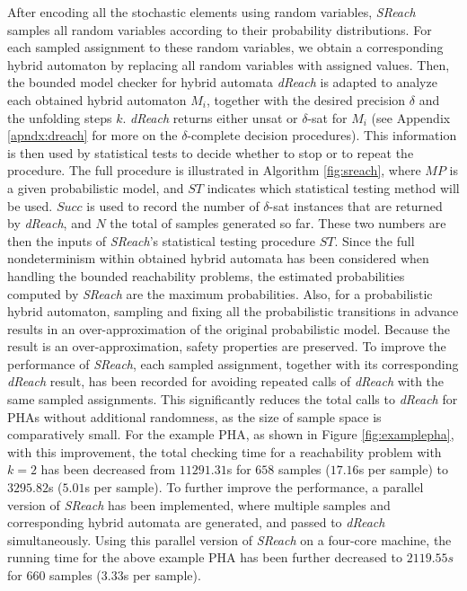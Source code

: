 After encoding all the stochastic elements using random variables, {\it SReach} samples all random variables according to their probability distributions. For each sampled assignment to these random variables, we obtain a corresponding hybrid automaton by replacing all random variables with assigned values. Then, the bounded model checker for hybrid automata {\it dReach} \cite{gaodelta} is adapted to analyze each obtained hybrid automaton $M_i$, together with the desired precision $\delta$ and the unfolding steps $k$. {\it dReach} returns either unsat or $\delta$-sat for $M_i$ (see Appendix \ref{apndx:dreach} for more on the $\delta$-complete decision procedures). This information
is then used by statistical tests to decide whether to stop or to repeat the procedure. The full procedure is illustrated in Algorithm \ref{fig:sreach}, where $MP$ is a given probabilistic model, and $ST$ indicates which statistical testing method will be used. $Succ$ is used to record the number of $\delta$-sat instances that are returned by {\it dReach}, and $N$ the total of samples generated so far. These two numbers are then the inputs of {\it SReach}'s statistical testing procedure $ST$. Since the full nondeterminism within obtained hybrid automata has been considered when handling the bounded reachability problems, the estimated probabilities computed by {\it SReach} are the maximum probabilities. Also, for a probabilistic hybrid automaton, sampling and fixing all the probabilistic transitions in advance results in an over-approximation of the original probabilistic model. Because the result is an over-approximation, safety properties are preserved. To improve the performance of {\it SReach}, each sampled assignment, together with its corresponding {\it dReach} result, has been recorded for avoiding repeated calls of {\it dReach} with the same sampled assignments. This significantly reduces the total calls to {\it dReach} for PHAs without additional randomness, as the size of sample space is comparatively small. For the example PHA, as shown in Figure \ref{fig:examplepha}, with this improvement, the total checking time for a reachability problem with $k=2$ has been decreased from $11291.31$s for $658$ samples ($17.16$s per sample) to $3295.82$s ($5.01$s per sample). To further improve the performance, a parallel version of {\it SReach} has been implemented, where multiple samples and corresponding hybrid automata are generated, and passed to {\it dReach} simultaneously. Using this parallel version of {\it SReach} on a four-core machine, the running time for the above example PHA has been further decreased to $2119.55s$ for $660$ samples ($3.33$s per sample). 
